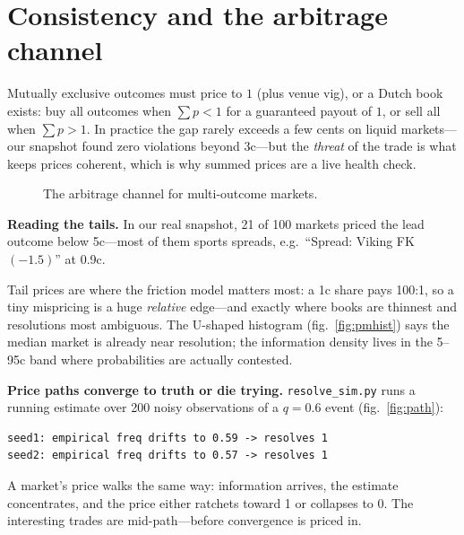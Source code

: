 \section{Consistency and the arbitrage channel}\label{sec:pmarb}

Mutually exclusive outcomes must price to $1$ (plus venue vig), or a Dutch book exists:
buy all outcomes when $\sum p < 1$ for a guaranteed payout of $1$, or sell all when
$\sum p>1$. In practice the gap rarely exceeds a few cents on liquid markets---our snapshot
found zero violations beyond 3c---but the \emph{threat} of the trade is what keeps prices
coherent, which is why summed prices are a live health check.

\begin{figure}[htbp]\centering

\caption{The arbitrage channel for multi-outcome markets.}
\label{fig:arb}
\end{figure}

\begin{example}\label{ex:tails}
\textbf{Reading the tails.} In our real snapshot, 21 of 100 markets priced the lead outcome
below 5c---most of them sports spreads, e.g.\ ``Spread: Viking FK $(-1.5)$'' at 0.9c.
\begin{solution}
Tail prices are where the friction model matters most: a 1c share pays 100:1, so a tiny
mispricing is a huge \emph{relative} edge---and exactly where books are thinnest and
resolutions most ambiguous. The U-shaped histogram (fig.\ \ref{fig:pmhist}) says the median
market is already near resolution; the information density lives in the 5--95c band where
probabilities are actually contested.
\end{solution}
\end{example}

\begin{example}\label{ex:respath}
\textbf{Price paths converge to truth or die trying.} \texttt{resolve\_sim.py} runs a running
estimate over 200 noisy observations of a $q=0.6$ event (fig.\ \ref{fig:path}):
\begin{lstlisting}[numbers=none]
seed1: empirical freq drifts to 0.59 -> resolves 1
seed2: empirical freq drifts to 0.57 -> resolves 1
\end{lstlisting}
A market's price walks the same way: information arrives, the estimate concentrates, and the
price either ratchets toward 1 or collapses to 0. The interesting trades are mid-path---before
convergence is priced in.
\end{example}

